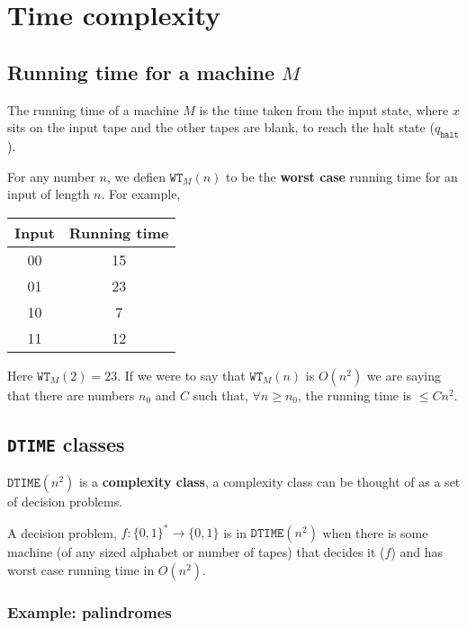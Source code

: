 \documentclass{article}
\begin{document}
\section{Time complexity}

\subsection{Running time for a machine $M$}

The running time of a machine $M$ is the time taken from the input state, where $x$ sits on the input tape and the other tapes are blank, to reach the halt state ($q_{\texttt{halt} }$).

For any number $n$, we defien $\texttt{WT}_{M}(n) $ to be the \textbf{worst case} running time for an input of length $n$.
For example,

\begin{center}
 \begin{tabular}{|c|c|}
 \hline
 Input & Running time\\ [0.5ex]
 \hline\hline
 00 & 15 \\
 \hline
 01 & 23 \\
 \hline
 10 & 7 \\
 \hline
 11 & 12\\
 \hline
\end{tabular}
\end{center}

Here $\texttt{WT} _{M}(2) = 23$. If we were to say that $\texttt{WT} _{M}(n)$ is $O(n^{2})$ we are saying that there are numbers $n_{0}$ and $C$ such that, $\forall n \geq n_{0}$, the running time is $\leq Cn^{2}$.

\subsection{\texttt{DTIME} classes }

$\texttt{DTIME}(n^{2})$ is a \textbf{complexity class}, a complexity class can be thought of as a set of decision problems.

A decision problem, $f : \{ 0,1 \}^{*} \rightarrow \{ 0,1 \}  $ is in $\texttt{DTIME}(n^{2}) $ when there is some machine (of any sized alphabet or number of tapes) that decides it ($f$) and has worst case running time in $O(n^{2})$.

\subsubsection{Example: palindromes}
\end{document}
